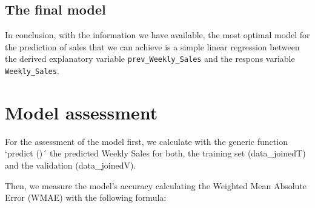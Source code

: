 \documentclass[11pt,]{article}
\newenvironment{Shaded}{\begin{snugshade}}{\end{snugshade}}
\newcommand{\KeywordTok}[1]{\textcolor[rgb]{0.13,0.29,0.53}{\textbf{{#1}}}}
\newcommand{\DataTypeTok}[1]{\textcolor[rgb]{0.13,0.29,0.53}{{#1}}}
\newcommand{\StringTok}[1]{\textcolor[rgb]{0.31,0.60,0.02}{{#1}}}
\newcommand{\CommentTok}[1]{\textcolor[rgb]{0.56,0.35,0.01}{\textit{{#1}}}}
\newcommand{\NormalTok}[1]{{#1}}
\begin{document}
\subsection{The final model}\label{the-final-model}

In conclusion, with the information we have available, the most optimal
model for the prediction of sales that we can achieve is a simple linear
regression between the derived explanatory variable
\texttt{prev\_Weekly\_Sales} and the respons variable
\texttt{Weekly\_Sales}.

\begin{Shaded}
\end{Shaded}

\section{Model assessment}\label{model-assessment}

For the assessment of the model first, we calculate with the generic
function `predict ()´ the predicted Weekly Sales for both, the training
set (data\_joinedT) and the validation (data\_joinedV).

\begin{Shaded}
\end{Shaded}

Then, we measure the model's accuracy calculating the Weighted Mean
Absolute Error (WMAE) with the following formula:
\end{document}
